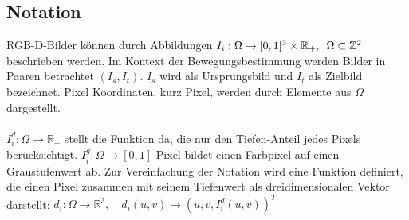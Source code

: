 \documentclass[12pt,DIV=15,BCOR=15mm,twoside,headsepline,abstract=true,listof=totoc,bibliography=totoc]{scrreprt}
\theoremstyle{remark}    %
\begin{document}
    \subsection{Notation}
    \ac{RGB-D}-Bilder können durch Abbildungen $I_i: \Omega \to [0,1]^3 \times \mathbb{R}_+, \hspace{0.5em}\Omega \subset \mathbb{Z}^2$ beschrieben werden. 
    Im Kontext der Bewegungsbestimmung werden Bilder in Paaren betrachtet $(I_s, I_t)$. $I_s$ wird als Ursprungsbild und $I_t$ als Zielbild bezeichnet. Pixel 
    Koordinaten, kurz Pixel, werden durch Elemente aus $\Omega$ dargestellt.\\\\
    $I_i^d: \Omega \to \mathbb{R}_+$ stellt die Funktion da, die nur den Tiefen-Anteil jedes Pixels berücksichtigt.
    $I_i^g: \Omega \to [0,1]$ Pixel bildet einen Farbpixel auf einen Graustufenwert ab. Zur Vereinfachung der Notation wird eine Funktion definiert, die einen Pixel 
    zusammen mit seinem Tiefenwert als dreidimensionalen Vektor darstellt:  $ d_i: \Omega \to \mathbb{R}^3,\hspace{1em} d_i(u,v) 
    \mapsto (u,v,I_i^d(u,v))^T$
\end{document}

